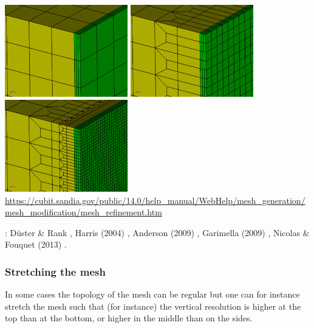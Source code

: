 \begin{center}
\includegraphics[height=4cm]{images/meshes/refine_mesh_sheet_directional1}
\includegraphics[height=4cm]{images/meshes/refine_mesh_sheet_directional2}
\includegraphics[height=4cm]{images/meshes/refine_mesh_sheet_directional4}\\
\url{https://cubit.sandia.gov/public/14.0/help_manual/WebHelp/mesh_generation/mesh_modification/mesh_refinement.htm}
\end{center}

\Literature: 
D{\"u}ster \& Rank \cite{dura01},
Harris \etal (2004) \cite{habo04},
Anderson \etal (2009) \cite{anbo09},
Garimella (2009) \cite{gari09},
Nicolas \& Fouquet (2013) \cite{nifo13,nifo13b}.
\cite{parr07,
ande09,
schn00}


\subsubsection{Stretching the mesh}

In some cases the topology of the mesh can be regular but one can for instance stretch 
the mesh such that (for instance) the vertical resolution is higher at the top than at the bottom, 
or higher in the middle than on the sides.

